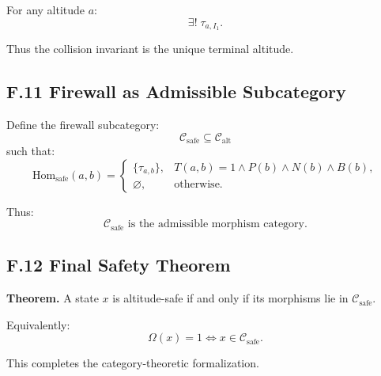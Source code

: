 For any altitude $a$:
\[
\exists !\; \tau_{a,I_1}.
\]

Thus the collision invariant is the unique terminal altitude.

\subsection*{F.11 Firewall as Admissible Subcategory}

Define the firewall subcategory:
\[
\mathcal{C}_{\mathrm{safe}} \subseteq \mathcal{C}_{\mathrm{alt}}
\]
such that:
\[
\mathrm{Hom}_{\mathrm{safe}}(a,b) =
\begin{cases}
\{\tau_{a,b}\}, & T(a,b)=1 \land P(b) \land N(b) \land B(b), \\
\varnothing, & \text{otherwise}.
\end{cases}
\]

Thus:
\[
\mathcal{C}_{\mathrm{safe}} \text{ is the admissible morphism category}.
\]

\subsection*{F.12 Final Safety Theorem}

\textbf{Theorem.}  
A state $x$ is altitude-safe if and only if its morphisms lie in
$\mathcal{C}_{\mathrm{safe}}$.

Equivalently:
\[
\Omega(x)=1 \iff x \in \mathcal{C}_{\mathrm{safe}}.
\]

This completes the category-theoretic formalization.
